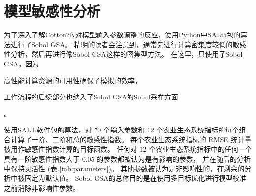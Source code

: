 \chapter{模型敏感性分析}\label{chap:sa}
为了深入了解Cotton2K对模型输入参数调整的反应，使用Python中SALib包的算法进行了Sobol GSA。%
精明的读者会注意到，通常先进行计算密集度较低的敏感性分析，然后再进行像Sobol GSA这样的密集型方法。%
在这里，只使用了Sobol GSA，因为\begin{enumerate*}
    \item 高性能计算资源的可用性确保了模拟的效率，
    \item 工作流程的后续部分也纳入了Sobol GSA的Sobol采样方面
\end{enumerate*} 。

使用SALib软件包的算法，对 70 个输入参数和 12 个农业生态系统指标的每个组合计算了一阶、二阶和总的敏感性指数。%
每个农业生态系统指标的 RMSE 统计量被用作敏感性指数计算的目标函数。%
任何对 12 个农业生态系统指标中的任何一个具有一阶敏感性指数大于 0.05 的参数都被认为是有影响的参数，%
并在随后的分析中保持灵活性 (表 \ref{tab:parameters})。%
其他参数被认为是非影响性的，在剩余的分析中被固定为默认值。%
Sobol GSA的总体目的是在使用多目标优化进行模型校准之前消除非影响性参数。
